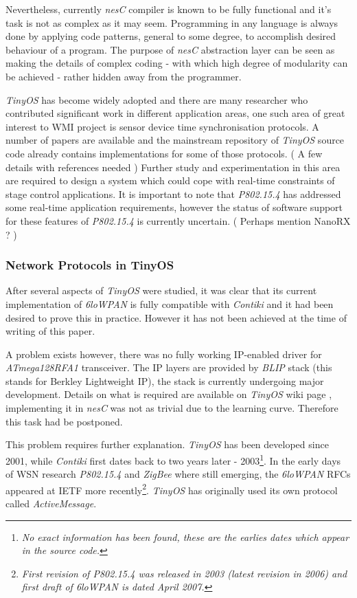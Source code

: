 {{ Nevertheless, currently \emph{nesC} compiler is known to be fully
 functional and it's task is not as complex as it may seem. Programming
 in any language is always done by applying code patterns, general
 to some degree, to accomplish desired behaviour of a program.
 The purpose of \emph{nesC} abstraction layer can be seen as making
 the details of complex coding - with which high degree of modularity
 can be achieved - rather hidden away from the programmer.

  \emph{TinyOS} has become widely adopted and there are many researcher
 who contributed significant work in different application areas, one
 such area of great interest to WMI project is sensor device time
 synchronisation protocols. A number of papers are available and the
 mainstream repository of \emph{TinyOS} source code already contains
 implementations for some of those protocols.
 ( A few details with references needed )
  Further study and experimentation in this area are required to design
 a system which could cope with real-time constraints of stage control
 applications. It is important to note that \emph{P802.15.4} has addressed
 some real-time application requirements, however the status of software
 support for these features of \emph{P802.15.4} is currently uncertain.
 ( Perhaps mention NanoRX ? )

\subsubsection{Network Protocols in TinyOS}
 
  After several aspects of \emph{TinyOS} were studied, it was clear
 that its current implementation of \emph{6loWPAN} is fully compatible
 with \emph{Contiki} and it had been desired to prove this in practice.
 However it has not been achieved at the time of writing of this paper.
  
  A problem exists however, there was no fully working IP-enabled driver
 for \emph{ATmega128RFA1} transceiver. The IP layers are provided by
 \emph{BLIP} stack (this stands for Berkley Lightweight IP), the stack
 is currently undergoing major development. Details on what is required
 are available on \emph{TinyOS} wiki page \cite{tinyos:wiki:blip-2-0},
 implementing it in \emph{nesC} was not as trivial due to the learning
 curve. Therefore this task had be postponed.

  This problem requires further explanation. \emph{TinyOS} has been
 developed since 2001, while \emph{Contiki} first dates back to two
 years later - 2003\footnote{\emph{No exact information has been
 found, these are the earlies dates which appear in the source code.}}. 
 In the early days of WSN research \emph{P802.15.4} and \emph{ZigBee}
 where still emerging, the \emph{6loWPAN} RFCs appeared at IETF more
 recently\footnote{\emph{First revision of P802.15.4 was released in
 2003 (latest revision in 2006) and first draft of 6loWPAN is dated
 April 2007.}}. \emph{TinyOS} has originally used its own protocol
 called \emph{ActiveMessage}.

}}
